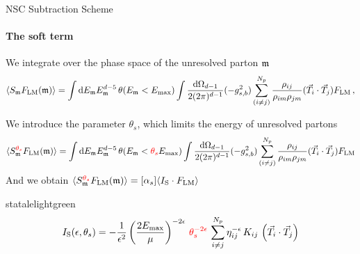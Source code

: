 \begin{frame} {NSC Subtraction Scheme}
  \framesubtitle{The soft term}
We integrate over the phase space of the unresolved parton $\mathfrak{m}$ 
\begin{equation*}
  \langle S_{\mathfrak{m}} F_{\mathrm{LM}} (\mathfrak{m}) \rangle = \int \mathrm{d}E_{\mathfrak{m}} E_{\mathfrak{m}}^{d-5} \, \theta(E_{\mathfrak{m}} < E_{\mathrm{max}})  \int \frac{\mathrm{d}\Omega_{d-1}}{2 (2 \pi)^{d-1}} (-g_{s,b}^2) \sum_{(i \neq j)}^{N_p} \frac{\rho_{ij}}{\rho_{im}\rho_{jm}} (\vec{T}_i \cdot \vec{T}_j) F_{\mathrm{LM}} \, ,
\end{equation*}

\pause
We introduce the parameter $\theta_s$, which limits the energy of unresolved partons
\begin{equation*}
  \langle S_{\mathfrak{m}}^{\textcolor{red}{\theta_s}} F_{\mathrm{LM}} (\mathfrak{m}) \rangle = \int \mathrm{d}E_{\mathfrak{m}} E_{\mathfrak{m}}^{d-5} \, \theta(E_{\mathfrak{m}} < \textcolor{red}{\theta_s} E_{\mathrm{max}})  \int \frac{\mathrm{d}\Omega_{d-1}}{2 (2 \pi)^{d-1}} (-g_{s,b}^2) \sum_{(i \neq j)}^{N_p} \frac{\rho_{ij}}{\rho_{im}\rho_{jm}} (\vec{T}_i \cdot \vec{T}_j) F_{\mathrm{LM}} 
\end{equation*}
\pause
And we obtain \qquad \qquad \quad $\langle S_{\mathfrak{m}}^{\textcolor{red}{\theta_s}} F_\mathrm{LM}(\mathfrak{m}) \rangle = [\alpha_s] \langle I_{\mathrm{S}}\cdot F_{\mathrm{LM}} \rangle$
\begin{colorblock}[black]{statalelightgreen}{}
    \begin{equation*}
  I_{\mathrm{S}} (\epsilon, \theta_s)= -\frac{1}{\epsilon^2} \left(\frac{2E_{\mathrm{max}}}{\mu}\right)^{-2\epsilon} \, \textcolor{red}{\theta_s^{-2\epsilon}} \, \sum_{i \neq j }^{N_p} \eta_{ij}^{-\epsilon} \, K_{ij} \, \left( \vec{T}_i \cdot \vec{T}_j\right)
        \end{equation*}
      \end{colorblock}


\end{frame}



